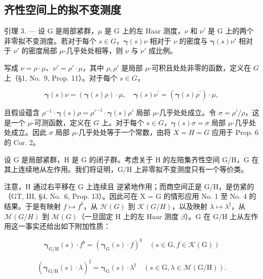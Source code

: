 \subsection{齐性空间上的拟不变测度}

引理 3. --- 设 G 是局部紧群，\(\mu\) 是 G 上的左 Haar 测度，\(\nu\) 和 \(\nu'\) 是 G 上的两个非零拟不变测度。若对于每个 \(s \in G\)，\(\boldsymbol{\gamma}(s)\nu\) 相对于 \(\nu\) 的密度与 \(\boldsymbol{\gamma}(s)\nu'\) 相对于 \(\nu'\) 的密度局部 \(\mu\)-几乎处处相等，则 \(\nu\) 与 \(\nu'\) 成比例。

写成 \(\nu = \rho \cdot \mu\)、\(\nu' = \rho' \cdot \mu\)，其中 \(\rho, \rho'\) 是局部 \(\mu\)-可积且处处非零的函数，定义在 \(G\) 上（§1, No.~9, Prop. 11）。对于每个 \(s \in G\)，

\[
\boldsymbol {\gamma} (s) \nu = (\boldsymbol {\gamma} (s) \rho) \cdot \mu , \quad \boldsymbol {\gamma} (s) \nu^ {\prime} = (\boldsymbol {\gamma} (s) \rho^ {\prime}) \cdot \mu ,
\]

且假设蕴含 \(\rho^{-1} \cdot \pmb{\gamma}(s) \rho = \rho'^{-1} \cdot \pmb{\gamma}(s) \rho'\) 局部 \(\mu\)-几乎处处成立。令 \(\sigma = \rho'/\rho\)，这是一个 \(\mu\)-可测函数，定义在 \(G\) 上。对于每个 \(s \in G\)，\(\pmb{\gamma}(s) \sigma = \sigma\) 局部 \(\mu\)-几乎处处成立。因此 \(\sigma\) 局部 \(\mu\)-几乎处处等于一个常数，由将 \(X = H = G\) 应用于 Prop. 6 的 Cor. 2。

设 G 是局部紧群，H 是 G 的闭子群。考虑关于 H 的左陪集齐性空间 G/H，G 在其上连续地从左作用。我们将证明，G/H 上非零拟不变测度只有一个等价类。

注意，H 通过右平移在 G 上连续且 逆紧地作用；而商空间正是 G/H，是仿紧的（GT, III, §4, No.~6, Prop. 13）。因此可在 X = G 的情形应用 No. 1 至 No. 4 的结果。于是有映射 \(f \mapsto f^{b}\)，从 \(\mathcal{H}(G)\) 到 \(\mathcal{K}(G/H)\)，以及映射 \(\lambda \mapsto \lambda^{\sharp}\)，从 \(\mathcal{M}(G/H)\) 到 \(\mathcal{M}(G)\)（一旦固定 H 上的左 Haar 测度 \(\beta\)）。G 在 G/H 上从左作用这一事实还给出如下附加性质：

\[
\boldsymbol {\gamma} _ {\mathrm{G/H}} (s) \cdot f ^ {b} = \left(\boldsymbol {\gamma} _ {\mathrm{G}} (s) \cdot f\right) ^ {b} \quad \left(s \in \mathrm{G}, f \in \mathscr {K} (\mathrm{G})\right)\tag{15}
\]

\[
\left(\boldsymbol {\gamma} _ {\mathrm{G/H}} (s) \cdot \lambda\right) ^ {\sharp} = \boldsymbol {\gamma} _ {\mathrm{G}} (s) \cdot \lambda^ {\sharp} \quad \left(s \in \mathrm{G}, \lambda \in \mathscr {M} (\mathrm{G/H})\right).\tag{16}
\]

